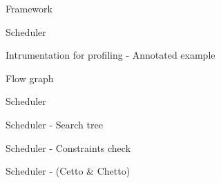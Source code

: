 \documentclass[xcolor=dvipsnames]{beamer}
\begin{document}
\begin{section}{Framework}
\begin{frame}{\hskip 0.3cm Scheduler}






\end{frame}












\begin{frame}{\hskip 0.3cm Intrumentation for profiling - Annotated example}
\end{frame}












\begin{frame}{\hskip 0.3cm Flow graph}
\end{frame}












\begin{frame}{\hskip 0.3cm Scheduler}
\end{frame}












\begin{frame}{\hskip 0.3cm Scheduler - Search tree}
\end{frame}












\begin{frame}{\hskip 0.3cm Scheduler - Constraints check}
\end{frame}












\begin{frame}{\hskip 0.3cm Scheduler - (Cetto \& Chetto)}
\end{frame}













\end{section}
\end{document}
